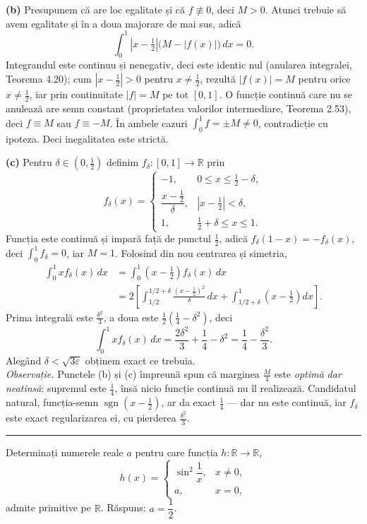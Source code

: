 \noindent\textbf{(b)} Presupunem că are loc egalitate și că $f\not\equiv 0$, deci
$M>0$. Atunci trebuie să avem egalitate și în a doua majorare de mai sus, adică
\[ \int_0^1 \left|x-\tfrac12\right|\bigl(M-|f(x)|\bigr)\,dx = 0 . \]
Integrandul este continuu și nenegativ, deci este identic nul (anularea integralei,
Teorema 4.20); cum $\left|x-\frac12\right|>0$ pentru $x\neq\frac12$, rezultă
$|f(x)|=M$ pentru orice $x\neq\frac12$, iar prin continuitate $|f|=M$ pe tot
$[0,1]$. O funcție continuă care nu se anulează are semn constant (proprietatea
valorilor intermediare, Teorema 2.53), deci $f\equiv M$ sau $f\equiv -M$. În ambele
cazuri $\int_0^1 f = \pm M \neq 0$, contradicție cu ipoteza. Deci inegalitatea este
strictă.

\noindent\textbf{(c)} Pentru $\delta\in\left(0,\frac12\right)$ definim
$f_\delta:[0,1]\to\mathbb{R}$ prin
\[ f_\delta(x)=\begin{cases}
-1, & 0\le x\le \frac12-\delta,\\[3pt]
\dfrac{x-\frac12}{\delta}, & \left|x-\frac12\right|<\delta,\\[8pt]
1, & \frac12+\delta\le x\le 1 .
\end{cases} \]
Funcția este continuă și impară față de punctul $\frac12$, adică
$f_\delta(1-x)=-f_\delta(x)$, deci $\int_0^1 f_\delta = 0$, iar $M=1$. Folosind din
nou centrarea și simetria,
\[ \begin{aligned} \int_0^1 x f_\delta(x)\,dx &= \int_0^1\left(x-\tfrac12\right)f_\delta(x)\,dx\\
&= 2\left[\int_{1/2}^{1/2+\delta}\frac{\left(x-\frac12\right)^2}{\delta}\,dx
+ \int_{1/2+\delta}^{1}\left(x-\tfrac12\right)dx\right] . \end{aligned} \]
Prima integrală este $\frac{\delta^2}{3}$, a doua este
$\frac12\left(\frac14-\delta^2\right)$, deci
\[ \int_0^1 x f_\delta(x)\,dx = \frac{2\delta^2}{3} + \frac14 - \delta^2
= \frac14 - \frac{\delta^2}{3} . \]
Alegând $\delta<\sqrt{3\varepsilon}$ obținem exact ce trebuia.\\[2pt]
\emph{Observație.} Punctele (b) și (c) împreună spun că marginea $\frac M4$ este
\emph{optimă dar neatinsă}: supremul este $\frac14$, însă nicio funcție continuă
nu îl realizează. Candidatul natural, funcția-semn $\operatorname{sgn}(x-\frac12)$,
ar da exact $\frac14$ --- dar nu este continuă, iar $f_\delta$ este exact
regularizarea ei, cu pierderea $\frac{\delta^2}{3}$.
\vspace{1mm}\hrule

Determinați numerele reale $a$ pentru care funcția $h:\mathbb{R}\to\mathbb{R}$,
\[ h(x)=\begin{cases}\sin^2\dfrac1x, & x\neq 0,\\[4pt] a, & x=0,\end{cases} \]
admite primitive pe $\mathbb{R}$.
\sol Răspuns: $a=\dfrac12$.

